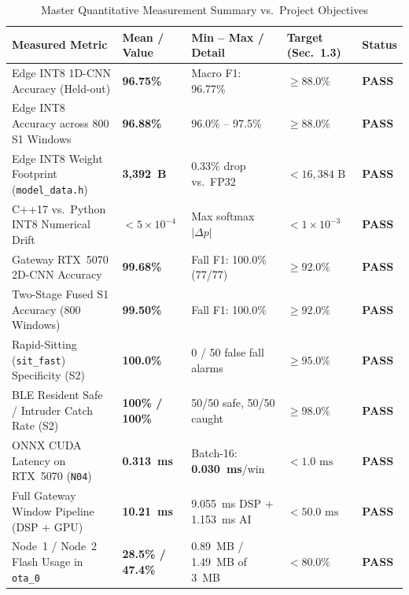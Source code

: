 \documentclass{hcmut-report}
\begin{document}
\begin{table}[H]
\centering
\caption{Master Quantitative Measurement Summary vs.\ Project Objectives}
\label{tab:master_results}
\footnotesize
\begin{tabularx}{\textwidth}{|Y|C{2.1cm}|C{2.7cm}|C{2.2cm}|C{1.45cm}|}
\hline
\textbf{Measured Metric} & \textbf{Mean / Value} & \textbf{Min -- Max / Detail} & \textbf{Target (Sec.~1.3)} & \textbf{Status} \\
\hline
Edge INT8 1D-CNN Accuracy (Held-out) & \textbf{96.75\%} & Macro F1: 96.77\% & $\ge 88.0\%$ & \textbf{PASS} \\
\hline
Edge INT8 Accuracy across 800 S1 Windows & \textbf{96.88\%} & 96.0\% -- 97.5\% & $\ge 88.0\%$ & \textbf{PASS} \\
\hline
Edge INT8 Weight Footprint (\texttt{model\_data.h}) & \textbf{3,392~B} & 0.33\% drop vs.\ FP32 & $< 16,384\text{ B}$ & \textbf{PASS} \\
\hline
C++17 vs.\ Python INT8 Numerical Drift & \textbf{$< 5\times 10^{-4}$} & Max softmax $|\Delta p|$ & $< 1\times 10^{-3}$ & \textbf{PASS} \\
\hline
Gateway RTX~5070 2D-CNN Accuracy & \textbf{99.68\%} & Fall F1: 100.0\% (77/77) & $\ge 92.0\%$ & \textbf{PASS} \\
\hline
Two-Stage Fused S1 Accuracy (800 Windows) & \textbf{99.50\%} & Fall F1: 100.0\% & $\ge 92.0\%$ & \textbf{PASS} \\
\hline
Rapid-Sitting (\texttt{sit\_fast}) Specificity (S2) & \textbf{100.0\%} & 0 / 50 false fall alarms & $\ge 95.0\%$ & \textbf{PASS} \\
\hline
BLE Resident Safe / Intruder Catch Rate (S2) & \textbf{100\% / 100\%} & 50/50 safe, 50/50 caught & $\ge 98.0\%$ & \textbf{PASS} \\
\hline
ONNX CUDA Latency on RTX~5070 (\texttt{N04}) & \textbf{0.313~ms} & Batch-16: \textbf{0.030~ms}/win & $< 1.0\text{ ms}$ & \textbf{PASS} \\
\hline
Full Gateway Window Pipeline (DSP + GPU) & \textbf{10.21~ms} & 9.055~ms DSP + 1.153~ms AI & $< 50.0\text{ ms}$ & \textbf{PASS} \\
\hline
Node~1 / Node~2 Flash Usage in \texttt{ota\_0} & \textbf{28.5\% / 47.4\%} & 0.89~MB / 1.49~MB of 3~MB & $< 80.0\%$ & \textbf{PASS} \\
\hline
\end{tabularx}
\end{table}
\end{document}
